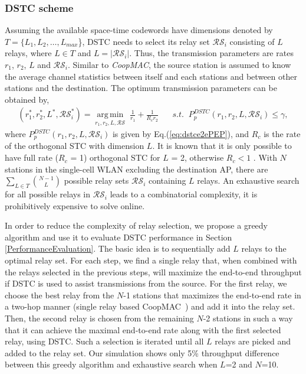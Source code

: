 \documentclass[peerreview,draftcls,onecolumn,12pt,a4paper]{IEEEtran}
\begin{document}
\subsubsection{DSTC scheme}
Assuming the available space-time codewords have dimensions
denoted by $T = \{L_1,L_2,\dots, L_{max}$\}, DSTC needs to select
its relay set $\mathcal{RS}_i$ consisting of $L$ relays, where $L
\in T$ and $L= \left|{\mathcal{RS}_i}\right|$. Thus, the
transmission parameters are rates $r_1$, $r_2$, $L$ and
$\mathcal{RS}_i$. Similar to \emph{CoopMAC}, the source station is
assumed to know the average channel statistics between itself and
each stations and between other stations and the destination. The
optimum transmission parameters can be obtained by,
\begin{eqnarray}
(r_{1}^{*}, r_{2}^{*}, L^{*}, \mathcal{RS}_i^*)=  \underset{r_{1}, r_{2}, L, \mathcal{RS}}{\operatorname{arg\,min}}  \; \frac{1}{r_{1}}+\frac{1}{R_{c} r_{2}} \;\;\;\;\;\; s.t. \;\; {P_{p}^{DSTC}(r_1, r_2, L, \mathcal{RS}_i)} \leq \gamma,
\label{dstcrateadapt}
\end{eqnarray} where ${P_{p}^{DSTC}(r_1, r_2, L,
\mathcal{RS}_i)}$ is given by Eq.(\ref{eq:dstce2ePEP}), and
${R_c}$ is the rate of the orthogonal STC with dimension $L$. It
is known that it is only possible to have full rate ($R_c$ = 1)
orthogonal STC for $L$ = 2, otherwise $R_c < 1$
\cite{Jafarkhanistcbook}. With $N$ stations in the single-cell
WLAN excluding the destination AP, there are $\sum_ {L \in
T}\binom{N-1}{L}$ possible relay sets $\mathcal{RS}_i$ containing $L$ relays. An
exhaustive search for all possible relays in $\mathcal{RS}_i$
leads to a combinatorial complexity, it is prohibitively expensive
to solve online. 


In order to reduce the complexity of relay selection, we propose a greedy algorithm and use it to evaluate DSTC performance in Section \ref{PerformanceEvaluation}. The basic idea is to sequentially add $L$ relays to the optimal relay set. For each step, we find a single relay that, when combined with the relays selected in the previous steps, will maximize the end-to-end throughput if DSTC is used to assist transmissions from the source. For the first relay, we choose the best relay from the $N$-1 stations that maximizes the end-to-end rate in a two-hop manner (single relay based CoopMAC~\cite{coopmacliu}) and add it into the relay set. Then, the second relay is chosen from the remaining $N$-2 stations in such a way that it can achieve the maximal end-to-end rate along with the first selected relay, using DSTC. Such a selection is iterated until all $L$ relays are picked and added to the relay set. Our simulation shows only 5\% throughput difference between this greedy algorithm and exhaustive search when $L$=2 and $N$=10.
\end{document}
